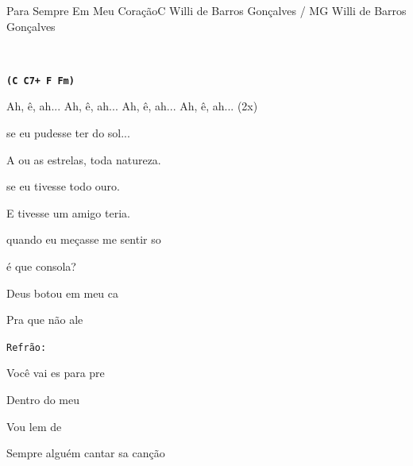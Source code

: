 \documentclass[a4,12pt,oneside]{book}
\newcommand{\RevDate}{\today}
\newcommand{\NotCCLIed}{\relax}
\begin{document}
\begin{song}{Para Sempre Em Meu Coração}{C}
  {Willi de Barros Gonçalves / MG}
  {Willi de Barros Gonçalves}
  {}
  {\NotCCLIed}
  
	\renewcommand{\RevDate}{24 de julho de 2014}

	
	\ifChordBk
		{\vspace{-2em}\flushright{\Cchord \quad \Csaumchord \quad \Fchord \quad \Fmchord \quad \Gschord \quad \Emchord \quad \Amchord}\\}
	\fi
	
	\begin{SBVerse*}
		\ifChordBk
		\texttt{\textbf{(C C7+ F Fm)}}
		\fi
		
		Ah, ê, ah... Ah, ê, ah... Ah, ê, ah... Ah, ê, ah... (2x)
	\end{SBVerse*}
	
	\begin{SBVerse*}
         se eu pudesse ter  do sol...
        
        A  ou as estrelas, toda  natureza.
        
         se eu tivesse todo  ouro.
        
        E  tivesse um amigo  teria.
        
         quando eu meçasse  me sentir so
        
         é que  consola? 
        
         Deus  botou  em  meu ca
        
        Pra que não  ale
	\end{SBVerse*}

	\begin{SBChorus*}
		{\small\texttt{Refrão:}}
		
		Você vai es para pre
		
		Dentro do meu 
		
		Vou lem de 
		
		Sempre  alguém cantar sa canção
	\end{SBChorus*}
	

\end{song}
\end{document}
